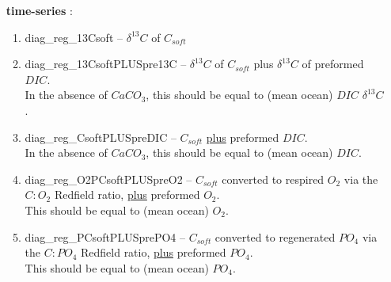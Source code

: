\vspace{1mm}
\begin{itemize}[noitemsep]

\vspace{1mm}
\item [\textbf{time-series}]:
\begin{enumerate}[noitemsep]
\vspace{1mm}
\item \textsf{\footnotesize diag\_reg\_13Csoft} -- \(\delta^{13}C\) of \(C_{soft}\)
\vspace{1mm}
\item \textsf{\footnotesize diag\_reg\_13CsoftPLUSpre13C} -- \(\delta^{13}C\) of \(C_{soft}\) plus \(\delta^{13}C\) of preformed \(DIC\). 
\\In the absence of \(CaCO_{3}\), this should be equal to (mean ocean) \(DIC\) \(\delta^{13}C\).
\vspace{1mm}
\item \textsf{\footnotesize diag\_reg\_CsoftPLUSpreDIC} -- \(C_{soft}\) \uline{plus} preformed \(DIC\).
\\In the absence of \(CaCO_{3}\), this should be equal to (mean ocean) \(DIC\).
\vspace{1mm}
\item \textsf{\footnotesize diag\_reg\_O2PCsoftPLUSpreO2} -- \(C_{soft}\) converted to respired \(O_{2}\) via the \(C:O_{2}\) Redfield ratio, \uline{plus} preformed \(O_{2}\).
\\This should be equal to (mean ocean) \(O_{2}\).
\vspace{1mm}
\item \textsf{\footnotesize diag\_reg\_PCsoftPLUSprePO4} -- \(C_{soft}\) converted to regenerated \(PO_{4}\) via the \(C:PO_{4}\) Redfield ratio, \uline{plus} preformed \(PO_{4}\).
\\This should be equal to (mean ocean) \(PO_{4}\).
\end{enumerate}


\end{itemize}

